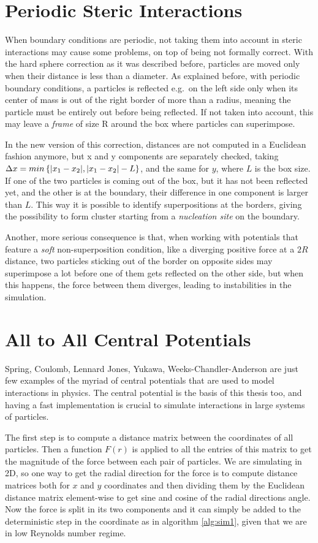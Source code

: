 \documentclass[../../master_thesis_np.tex]{subfiles}
\begin{document}
	\section{Periodic Steric Interactions}
	When boundary conditions are periodic, not taking them into account in steric interactions may cause some problems, on top of being not formally correct. With the hard sphere correction as it was described before, particles are moved only when their distance is less than a diameter. As explained before, with periodic boundary conditions, a particles is reflected e.g.~on the left side only when its center of mass is out of the right border of more than a radius, meaning the particle must be entirely out before being reflected. If not taken into account, this may leave a \emph{frame} of size R around the box where particles can superimpose. 
	
	In the new version of this correction, distances are not computed in a Euclidean fashion anymore, but x and y components are separately checked, taking $\Delta x = min \left\{ \abs{x_1-x_2}, \abs{x_1-x_2}-L \right\}$, and the same for $y$, where $L$ is the box size. If one of the two particles is coming out of the box, but it has not been reflected yet, and the other is at the boundary, their difference in one component is larger than $L$. This way it is possible to identify superpositions at the borders, giving the possibility to form cluster starting from a \emph{nucleation site} on the boundary. 
	
	Another, more serious consequence is that, when working with potentials that feature a \emph{soft} non-superposition condition, like a diverging positive force at a $2R$ distance, two particles sticking out of the border on opposite sides may superimpose a lot before one of them gets reflected on the other side, but when this happens, the force between them diverges, leading to instabilities in the simulation.
	
	\section{All to All Central Potentials}
	Spring, Coulomb, Lennard Jones, Yukawa, Weeks-Chandler-Anderson are just few examples of the myriad of central potentials that are used to model interactions in physics. The central potential is the basis of this thesis too, and having a fast implementation is crucial to simulate interactions in large systems of particles. 
	
	The first step is to compute a distance matrix between the coordinates of all particles. Then a function $F(r)$ is applied to all the entries of this matrix to get the magnitude of the force between each pair of particles. We are simulating in 2D, so one way to get the radial direction for the force is to compute distance matrices both for $x$ and $y$ coordinates and then dividing them by the Euclidean distance matrix element-wise to get sine and cosine of the radial directions angle. Now the force is split in its two components and it can simply be added to the deterministic step in the coordinate as in algorithm \ref{alg:sim1}, given that we are in low Reynolds number regime. 
	
\end{document}
